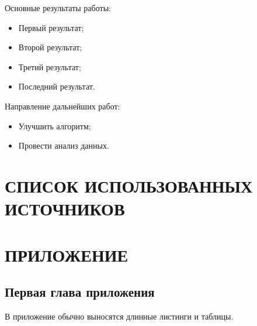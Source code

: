 Основные результаты работы:

\begin{itemize}
\tightlist
\item
  Первый результат;
\item
  Второй результат;
\item
  Третий результат;
\item
  Последний результат.
\end{itemize}

Направление дальнейших работ:

\begin{itemize}
\tightlist
\item
  Улучшить алгоритм;
\item
  Провести анализ данных.
\end{itemize}

\clearpage
\pagebreak

\section*{СПИСОК ИСПОЛЬЗОВАННЫХ ИСТОЧНИКОВ}\label{sec:bib}

\printbibliography[heading=none]

\renewcommand{\thesection}{П}
\setcounter{subsection}{0}
\setcounter{figure}{0}
\setcounter{lstlisting}{0}
\pagebreak

\section*{ПРИЛОЖЕНИЕ}\label{sec:appendix}

\subsection{Первая глава приложения}\label{sec:appendix-1}

В приложение обычно выносятся длинные листинги и таблицы.



